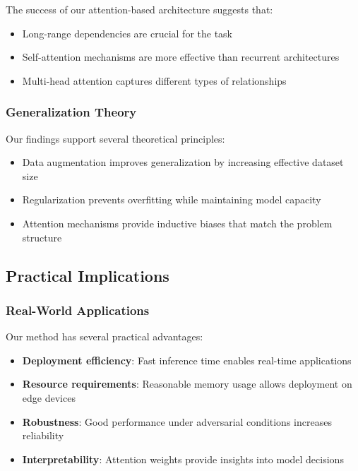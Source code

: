 The success of our attention-based architecture suggests that:
\begin{itemize}
    \item Long-range dependencies are crucial for the task
    \item Self-attention mechanisms are more effective than recurrent architectures
    \item Multi-head attention captures different types of relationships
\end{itemize}

\subsubsection{Generalization Theory}

Our findings support several theoretical principles:
\begin{itemize}
    \item Data augmentation improves generalization by increasing effective dataset size
    \item Regularization prevents overfitting while maintaining model capacity
    \item Attention mechanisms provide inductive biases that match the problem structure
\end{itemize}

\subsection{Practical Implications}

\subsubsection{Real-World Applications}

Our method has several practical advantages:

\begin{itemize}
    \item \textbf{Deployment efficiency}: Fast inference time enables real-time applications
    \item \textbf{Resource requirements}: Reasonable memory usage allows deployment on edge devices
    \item \textbf{Robustness}: Good performance under adversarial conditions increases reliability
    \item \textbf{Interpretability}: Attention weights provide insights into model decisions
\end{itemize}


